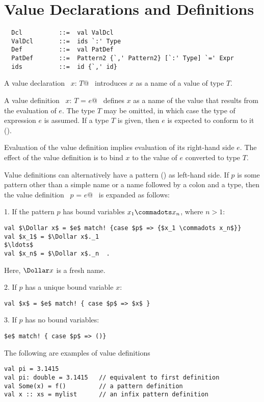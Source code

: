 \section{Value Declarations and Definitions}
\label{sec:valdef}

\syntax\begin{lstlisting}
  Dcl          ::=  val ValDcl
  ValDcl       ::=  ids `:' Type
  Def          ::=  val PatDef 
  PatDef       ::=  Pattern2 {`,' Pattern2} [`:' Type] `=' Expr
  ids          ::=  id {`,' id}
\end{lstlisting}

A value declaration ~\lstinline@val $x$: $T$@~ introduces $x$ as a name of a value of
type $T$.  

A value definition ~\lstinline@val $x$: $T$ = $e$@~ defines $x$ as a
name of the value that results from the evaluation of $e$. The type
$T$ may be omitted, in which case the type of expression $e$ is
assumed.  If a type $T$ is given, then $e$ is expected to conform to
it ().

Evaluation of the value definition implies evaluation of its
right-hand side $e$.  The effect of the value definition is to bind
$x$ to the value of $e$ converted to type $T$.

Value definitions can alternatively have a pattern
() as left-hand side.  If $p$ is some pattern other
than a simple name or a name followed by a colon and a type, then the
value definition ~\lstinline@val $p$ = $e$@~ is expanded as follows:

1. If the pattern $p$ has bound variables $x_1 \commadots x_n$, where $n > 1$:
\begin{lstlisting}
val $\Dollar x$ = $e$ match! {case $p$ => {$x_1 \commadots x_n$}}
val $x_1$ = $\Dollar x$._1
$\ldots$
val $x_n$ = $\Dollar x$._n  .
\end{lstlisting}
Here, $\Dollar x$ is a fresh name.  

2. If $p$ has a unique bound variable $x$:
\begin{lstlisting}
val $x$ = $e$ match! { case $p$ => $x$ }
\end{lstlisting}

3. If $p$ has no bound variables:
\begin{lstlisting}
$e$ match! { case $p$ => ()}
\end{lstlisting}

\example
The following are examples of value definitions
\begin{lstlisting}
val pi = 3.1415 
val pi: double = 3.1415   // equivalent to first definition
val Some(x) = f()         // a pattern definition
val x :: xs = mylist      // an infix pattern definition
\end{lstlisting}

